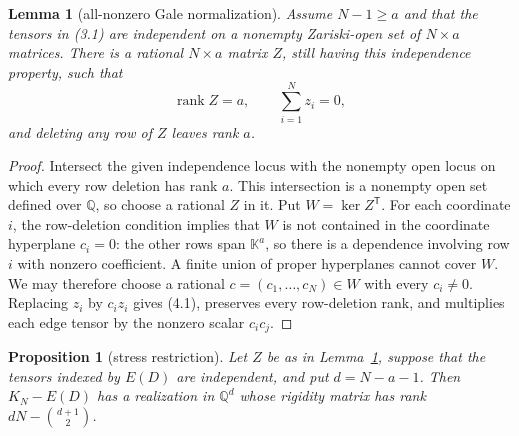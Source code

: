 \documentclass[11pt]{article}
\newtheorem{proposition}[theorem]{Proposition}
\newtheorem{lemma}[theorem]{Lemma}
\newcommand{\K}{\mathbb{K}}
\newcommand{\rank}{\operatorname{rank}}
\begin{document}
\begin{lemma}[all-nonzero Gale normalization]\label{lem:gale}
Assume $N-1\geq a$ and that the tensors in (3.1) are independent on a
nonempty Zariski-open set of $N\times a$ matrices.  There is a rational
$N\times a$ matrix $Z$, still having this independence property, such that
\[
 \rank Z=a,\qquad \sum_{i=1}^N z_i=0,
 \tag{4.1}
\]
and deleting any row of $Z$ leaves rank $a$.
\end{lemma}

\begin{proof}
Intersect the given independence locus with the nonempty open locus on which
every row deletion has rank $a$.  This intersection is a nonempty open set
defined over $\mathbb Q$, so choose a rational $Z$ in it.  Put
$W=\ker Z^{\mathsf T}$.  For each coordinate $i$, the row-deletion
condition implies that $W$ is not contained in the coordinate hyperplane
$c_i=0$: the other rows span $\K^a$, so there is a dependence involving
row $i$ with nonzero coefficient.  A finite union of proper hyperplanes
cannot cover $W$.  We may therefore choose a rational
$c=(c_1,\ldots,c_N)\in W$ with every $c_i\neq0$.  Replacing $z_i$ by
$c_i z_i$ gives (4.1), preserves every row-deletion rank, and multiplies
each edge tensor by the nonzero scalar $c_ic_j$.
\end{proof}

\begin{proposition}[stress restriction]\label{prop:stress}
Let $Z$ be as in Lemma~\ref{lem:gale}, suppose that the tensors indexed by
$E(D)$ are independent, and put $d=N-a-1$.  Then
$K_N-E(D)$ has a realization in $\mathbb Q^d$ whose rigidity matrix has
rank $dN-\binom{d+1}{2}$.
\end{proposition}
\end{document}
